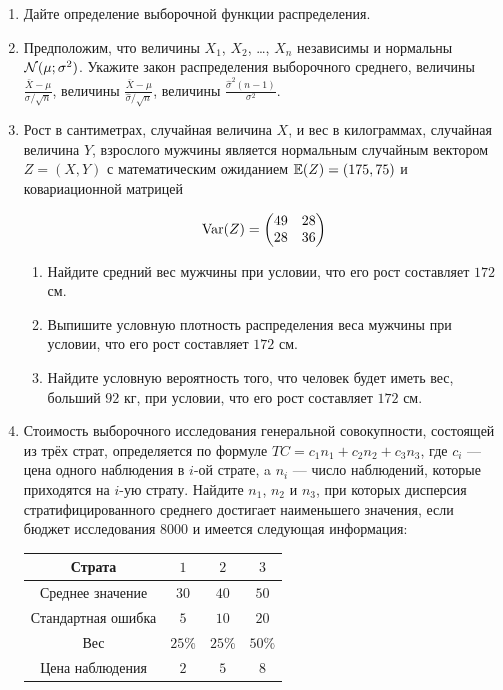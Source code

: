 \begin{enumerate}
\item Дайте определение выборочной функции распределения.
\item Предположим, что величины $X_1$, $X_2$, \ldots, $X_n$ независимы и нормальны
$\mathcal{N}(\mu;\sigma^2)$. Укажите закон распределения выборочного среднего, величины
$\frac{\bar X - \mu}{\sigma/\sqrt{n}}$, величины $\frac{\bar X - \mu}{\hat\sigma/\sqrt{n}}$,
величины $\frac{\hat\sigma^2(n-1)}{\sigma^2}$.
\item Рост в сантиметрах, случайная величина $X$, и вес в килограммах, случайная
величина $Y$, взрослого мужчины является нормальным случайным вектором $Z = (X, Y)$
с математическим ожиданием $\operatorname{\mathbb{E}}(Z) = (175, 75)$ и ковариационной матрицей

\[
\operatorname{Var}(Z) =
\begin{pmatrix}
49 & 28 \\
28 & 36
\end{pmatrix}
\]

\begin{enumerate}
\item Найдите средний вес мужчины при условии, что его рост составляет $172$ см.
\item Выпишите условную плотность распределения веса мужчины при условии, что его
рост составляет $172$ см.
\item Найдите условную вероятность того, что человек будет иметь вес, больший $92$ кг,
при условии, что его рост составляет $172$ см.
\end{enumerate}

\item Стоимость выборочного исследования генеральной совокупности, состоящей из трёх
страт, определяется по формуле $TC = c_1n_1 + c_2n_2 + c_3n_3$, где $c_i$ — цена
одного наблюдения в $i$-ой страте, a $n_i$ — число наблюдений, которые приходятся
на $i$-ую страту. Найдите $n_1$, $n_2$ и $n_3$, при которых дисперсия стратифицированного
среднего достигает наименьшего значения, если бюджет исследования 8000 и имеется
следующая информация:

\begin{center}
\begin{tabular}{cccc}
\toprule
Страта & $1$ & $2$ & $3$  \\
\midrule
Среднее значение & $30$ & $40$ & $50$ \\
Стандартная ошибка  & $5$ & $10$ & $20$ \\
Вес & $25\%$ & $25\%$ & $50\%$ \\
Цена наблюдения & $2$ & $5$ & $8$ \\
\bottomrule
\end{tabular}
\end{center}
\end{enumerate}


